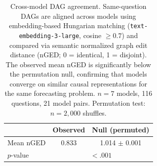 \begin{table}[ht]
\centering
\small
\caption{Cross-model DAG agreement. Same-question DAGs are aligned across models using embedding-based Hungarian matching (\texttt{text-embedding-3-large}, cosine $\geq 0.7$) and compared via semantic normalized graph edit distance (nGED; 0 = identical, 1 = disjoint). The observed mean nGED is significantly below the permutation null, confirming that models converge on similar causal representations for the same forecasting problem. $n = 7$ models, 116 questions, 21 model pairs. Permutation test: $n = 2{,}000$ shuffles.}
\label{tab:cross_model_agreement}
\begin{tabular}{lcc}
\toprule
 & \textbf{Observed} & \textbf{Null (permuted)} \\
\midrule
Mean nGED            & 0.833            & 1.014 $\pm$ 0.001 \\
$p$-value            & \multicolumn{2}{c}{$<.001$} \\
\bottomrule
\end{tabular}
\end{table}
